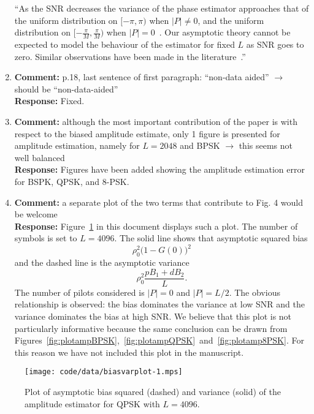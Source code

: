 \documentclass{article}
\newcommand{\abs}[1]{{\left\vert #1 \right\vert}}
\begin{document}
\begin{enumerate}
``As the SNR decreases the variance of the phase estimator approaches that of the uniform distribution on $[-\pi, \pi)$ when $\abs{P} \neq 0$, and the uniform distribution on $[-\tfrac{\pi}{M}, \tfrac{\pi}{M})$ when $\abs{P}=0$~\cite{McKilliam_leastsqPSKnoncoICASSP_2012}.  Our asymptotic theory cannot be expected to model the behaviour of the estimator for fixed $L$ as SNR goes to zero.  Similar observations have been made in the literature~\cite{ViterbiViterbi_phase_est_1983,6365847}.''

\item \textbf{Comment:} p.18, last sentence of first paragraph: ``non-data aided'' $\to$ should be ``non-data-aided''  \\
\textbf{Response:} Fixed.

\item \textbf{Comment:}  although the most important contribution of the paper is with respect to the biased amplitude estimate, only 1 figure is presented for amplitude estimation, namely for $L=2048$ and BPSK $\to$ this seems not well balanced  \\
\textbf{Response:} Figures have been added showing the amplitude estimation error for BSPK, QPSK, and 8-PSK.

\item \textbf{Comment:}  a separate plot of the two terms that contribute to Fig. 4 would be welcome \\

\textbf{Response:} Figure~\ref{fig:biasvarcomp} in this document displays such a plot.  The number of symbols is set to $L=4096$.  The solid line shows that asymptotic squared bias 
\[
\rho_0^2\big(1 - G(0)\big)^2
\]
and the dashed line is the asymptotic variance
\[
\rho_0^2\frac{p B_1 + d B_2}{L}.
\]
The number of pilots considered is $\abs{P}=0$ and $\abs{P}=L/2$.  The obvious relationship is observed: the bias dominates the variance at low SNR and the variance dominates the bias at high SNR.  We believe that this plot is not particularly informative because the same conclusion can be drawn from Figures~\ref{fig:plotampBPSK},~\ref{fig:plotampQPSK}~and~\ref{fig:plotamp8PSK}.  For this reason we have not included this plot in the manuscript.
  
\end{enumerate} 

\begin{figure}[tp]  
	\centering  
		\texttt{[image: code/data/biasvarplot-1.mps]}
		\caption{Plot of asymptotic bias squared (dashed) and variance (solid) of the amplitude estimator for QPSK with $L=4096$.}
		\label{fig:biasvarcomp}
\end{figure}
\end{document}
